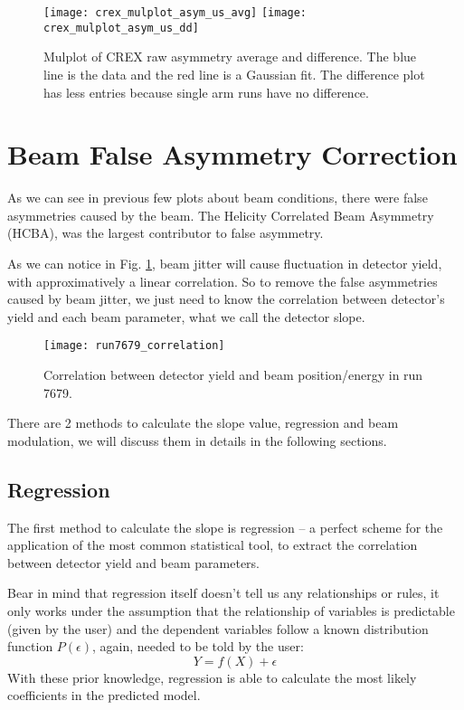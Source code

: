 \begin{figure}[H]
    \centering
    \texttt{[image: crex\_mulplot\_asym\_us\_avg]}
    \texttt{[image: crex\_mulplot\_asym\_us\_dd]}
    \caption{Mulplot of CREX raw asymmetry average and difference. The blue line
    is the data and the red line is a Gaussian fit. 
    The difference plot has less entries because single arm runs have no difference.}
\end{figure}


\section{Beam False Asymmetry Correction}
As we can see in previous few plots about beam conditions, there were false
asymmetries caused by the beam. The Helicity Correlated Beam Asymmetry (HCBA), 
was the largest contributor to false asymmetry.

As we can notice in Fig. \ref{fig:correlation}, beam jitter will cause 
fluctuation in detector yield, with approximatively a linear correlation.
So to remove the false asymmetries caused by beam jitter, we just need to
know the correlation between detector's yield and each beam parameter, what
we call the detector slope. 

\begin{figure}[H]
    \centering
    \texttt{[image: run7679\_correlation]}
    \caption{Correlation between detector yield and beam position/energy in run 7679.}
    \label{fig:correlation}
\end{figure}

There are 2 methods to calculate the slope value, regression and beam modulation,
we will discuss them in details in the following sections.

\subsection{Regression}

The first method to calculate the slope is regression -- a perfect scheme for
the application of the most common statistical tool, to extract the correlation
between detector yield and beam parameters.

Bear in mind that regression itself doesn't tell us any relationships or rules, 
it only works under
the assumption that the relationship of variables is predictable (given by the user) 
and the dependent variables follow a known distribution function $P(\epsilon)$, 
again, needed to be told by the user:
$$ Y = f(X) + \epsilon $$
With these prior knowledge, regression is able to calculate the most likely 
coefficients in the predicted model.

